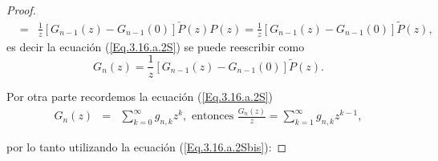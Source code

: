 \documentclass{article}
\numberwithin{equation}{section}
\begin{document}
\begin{proof}
\begin{eqnarray*}
&=&\frac{1}{z}\left[G_{n-1}\left(z\right)-G_{n-1}\left(0\right)\right]\check{P}\left(z\right)P\left(z\right)=\frac{1}{z}\left[G_{n-1}\left(z\right)-G_{n-1}\left(0\right)\right]\tilde{P}\left(z\right),
\end{eqnarray*}
es decir la ecuaci\'on (\ref{Eq.3.16.a.2S}) se puede reescribir como
\begin{equation}\label{Eq.3.16.a.2Sbis}
G_{n}\left(z\right)=\frac{1}{z}\left[G_{n-1}\left(z\right)-G_{n-1}\left(0\right)\right]\tilde{P}\left(z\right).
\end{equation}

Por otra parte recordemos la ecuaci\'on (\ref{Eq.3.16.a.2S})
\begin{eqnarray*}
G_{n}\left(z\right)&=&\sum_{k=0}^{\infty}g_{n,k}z^{k},\textrm{ entonces }\frac{G_{n}\left(z\right)}{z}=\sum_{k=1}^{\infty}g_{n,k}z^{k-1},
\end{eqnarray*}

por lo tanto utilizando la ecuaci\'on (\ref{Eq.3.16.a.2Sbis}):


\end{proof}
\end{document}
